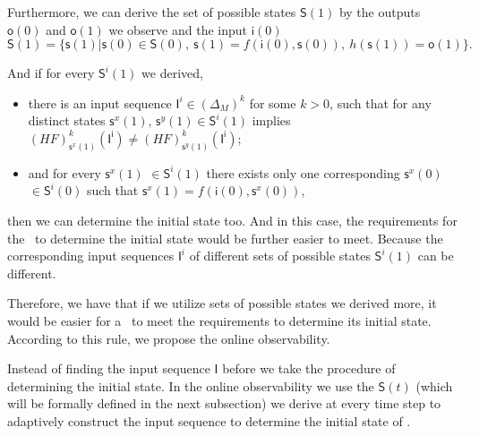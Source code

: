 Furthermore, we can derive the set of possible states $\mathsf{S}(1)$ by the outputs $\mathsf{o}(0)$ and $\mathsf{o}(1)$ we observe and the input $\mathsf{i}(0)$ 
\[\mathsf{S}(1)=\{\mathsf{s}(1)|\mathsf{s}(0)\in \mathsf{S}(0),\ \mathsf{s}(1)=f({\mathsf{i}(0)},{\mathsf{s}(0)}),\ h(\mathsf{s}(1))=\mathsf{o}(1)\}.\]

And if for every $\mathsf{S}^{i}(1)$ we derived, 
\begin{itemize}
  \item  there is an input sequence $\mathsf{I}^{i}\in(\Delta_M)^k$ for some $k>0$, such that for any distinct states $\mathsf{s}^{x}(1)$, $\mathsf{s}^{y}(1) \in \mathsf{S}^{i}(1)$ implies $(HF)^k_{\mathsf{s}^{x}(1)}(\mathsf{I^i})\neq (HF)^k_{\mathsf{s}^{y}(1)}(\mathsf{I^i})$;
  \item  and for every $\mathsf{s}^{x}(1)$ $\in \mathsf{S}^{i}(1)$ there exists only one corresponding $\mathsf{s}^{x}(0)$ $\in \mathsf{S}^{i}(0)$ such that $\mathsf{s}^{x}(1)=f({\mathsf{i}(0)},{\mathsf{s}^{x}(0)})$,
\end{itemize} 
then we can determine the initial state too. And in this case, the requirements for the \BCN\ to determine the initial state would be further easier to meet. Because the corresponding input sequences $\mathsf{I}^{i}$ of different sets of possible states $\mathsf{S}^{i}(1)$ can be different. 

Therefore, we have that if we utilize sets of possible states we derived more, it would be easier for a \BCN\ to meet the requirements to determine its initial state. According to this rule, we propose the online observability. 

Instead of finding the input sequence $\mathsf{I}$ before we take the procedure of determining the initial state. In the online observability we use the $\mathsf{S}(t)$ (which will be formally defined in the next subsection) we derive at every time step to adaptively construct the input sequence to determine the initial state of \BCNs. 

